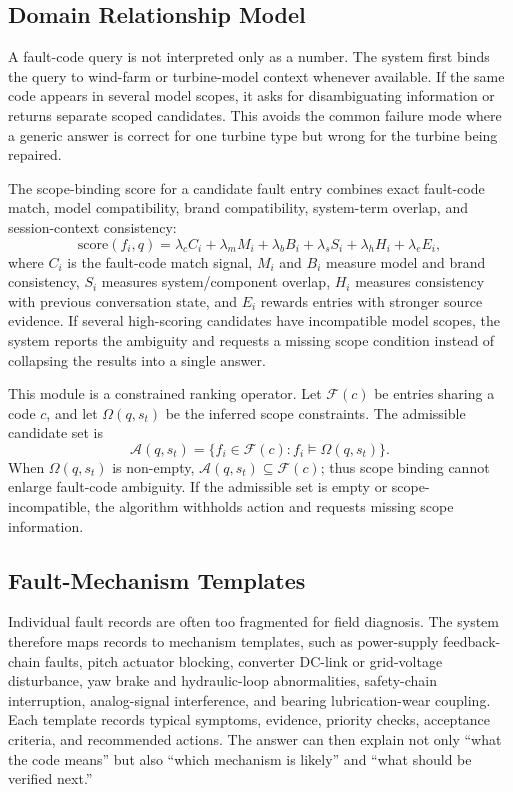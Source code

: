 \documentclass[lettersize,journal]{IEEEtran}
\begin{document}
\subsection{Domain Relationship Model}
A fault-code query is not interpreted only as a number. The system first binds the query to wind-farm or turbine-model context whenever available. If the same code appears in several model scopes, it asks for disambiguating information or returns separate scoped candidates. This avoids the common failure mode where a generic answer is correct for one turbine type but wrong for the turbine being repaired.

The scope-binding score for a candidate fault entry combines exact fault-code match, model compatibility, brand compatibility, system-term overlap, and session-context consistency:
\begin{equation}
\mathrm{score}(f_i,q)=\lambda_c C_i+\lambda_m M_i+\lambda_b B_i+\lambda_s S_i+\lambda_h H_i+\lambda_e E_i,
\end{equation}
where $C_i$ is the fault-code match signal, $M_i$ and $B_i$ measure model and brand consistency, $S_i$ measures system/component overlap, $H_i$ measures consistency with previous conversation state, and $E_i$ rewards entries with stronger source evidence. If several high-scoring candidates have incompatible model scopes, the system reports the ambiguity and requests a missing scope condition instead of collapsing the results into a single answer.

This module is a constrained ranking operator. Let $\mathcal{F}(c)$ be entries sharing a code $c$, and let $\Omega(q,s_t)$ be the inferred scope constraints. The admissible candidate set is
\begin{equation}
\mathcal{A}(q,s_t)=\{f_i\in \mathcal{F}(c): f_i \models \Omega(q,s_t)\}.
\end{equation}
When $\Omega(q,s_t)$ is non-empty, $\mathcal{A}(q,s_t)\subseteq \mathcal{F}(c)$; thus scope binding cannot enlarge fault-code ambiguity. If the admissible set is empty or scope-incompatible, the algorithm withholds action and requests missing scope information.

\subsection{Fault-Mechanism Templates}
Individual fault records are often too fragmented for field diagnosis. The system therefore maps records to mechanism templates, such as power-supply feedback-chain faults, pitch actuator blocking, converter DC-link or grid-voltage disturbance, yaw brake and hydraulic-loop abnormalities, safety-chain interruption, analog-signal interference, and bearing lubrication-wear coupling. Each template records typical symptoms, evidence, priority checks, acceptance criteria, and recommended actions. The answer can then explain not only ``what the code means'' but also ``which mechanism is likely'' and ``what should be verified next.''
\end{document}
